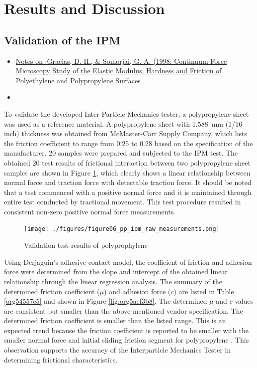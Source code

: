 \documentclass[xcolor=dvipsnames,10pt,hidelinks]{article}
\let\oldsubsection\subsection
\renewcommand{\subsection}{\clearpage\oldsubsection}
\begin{document}
\section{Results and Discussion}
\label{sec:orgec9c8e8}
\subsection{Validation of the IPM}
\label{sec:orgd54bfad}
\begin{itemize}
\item \parencite{gracias_continuum_1998}\href{../../../../../../../wd5t/local/docs/org/mindmap/gracias_continuum_1998.org}{Notes on :Gracias, D. H., \& Somorjai, G. A. (1998: Continuum Force Microscopy Study of the Elastic Modulus, Hardness and Friction of Polyethylene and Polypropylene Surfaces}
\item 
\end{itemize}

To validate the developed Inter-Particle Mechanics tester, a polypropylene sheet was used as a reference material.
A polypropylene sheet with \qty{1.588}{\milli\meter} (1/16 inch) thickness was obtained from McMaster-Carr Supply Company,
which lists the friction coefficient to range from 0.25 to 0.28 based on the specification of the manufacturer.
20 samples were prepared and subjected to the IPM test.
The obtained 20 test results of frictional interaction between two polypropylene sheet samples are shown in Figure \ref{fig:org92c85b3},
which clearly shows a linear relationship between normal force and traction force with detectable traction force.
It should be noted that a test commenced with a positive normal force and it is maintained through entire test conducted by tractional movement.
This test procedure resulted in consistent non-zero positive normal force measurements.

\begin{figure}[htbp]
\centering
\texttt{[image: ./figures/figure06\_pp\_ipm\_raw\_measurements.png]}
\caption{\label{fig:org92c85b3}Validation test results of polyprophylene}
\end{figure}

Using Derjaguin’s adhesive contact model,
the coefficient of friction and adhesion force were determined from the slope and intercept of the obtained linear relationship through the linear regression analysis. The summary of the determined friction coefficient (\(\mu\)) and adhesion force (\(c\)) are listed in Table \ref{org54557c5} and shown in Figure \ref{fig:org5aef3b8}.
The determined \(\mu\) and \(c\) values are consistent but smaller than the above-mentioned vendor specification.
The determined friction coefficient is smaller than the listed range.
This is an expected trend because the friction coefficient is reported to be smaller with the smaller normal force and initial sliding friction segment for polypropylene \parencite{gracias_continuum_1998,sedlak_effect_2017}.
This observation supports the accuracy of the Interparticle Mechanics Tester in determining frictional characteristics.
\end{document}
